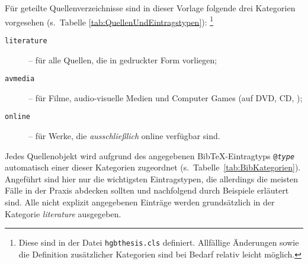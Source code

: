 Für geteilte Quellenverzeichnisse sind in dieser Vorlage folgende drei Kategorien vorgesehen
(s.\ Tabelle \ref{tab:QuellenUndEintragstypen}):%
\footnote{Diese sind in der Datei \nolinkurl{hgbthesis.cls} definiert.
Allfällige Änderungen sowie die Definition zusätzlicher Kategorien sind 
bei Bedarf relativ leicht möglich.}
%
\begin{description}
	\item[\texttt{literature}] -- für alle Quellen, die in gedruckter Form vorliegen;
	\item[\texttt{avmedia}] -- für Filme, audio-visuelle Medien und Computer Games (auf DVD, CD, \usw);
	\item[\texttt{online}] -- für Werke, die \emph{ausschließlich} online verfügbar sind.
\end{description}
%
Jedes Quellenobjekt wird aufgrund des angegebenen BibTeX-Eintragtyps 
\texttt{@\emph{type}} automatisch einer dieser Kategorien 
zugeordnet (s.\ Tabelle~\ref{tab:BibKategorien}).
Angeführt sind hier nur die wichtigsten Eintragstypen, die allerdings die meisten
Fälle in der Praxis abdecken sollten und nachfolgend durch Beispiele erläutert sind.
Alle nicht explizit angegebenen Einträge werden grundsätzlich in der Kategorie \emph{literature} 
ausgegeben.

